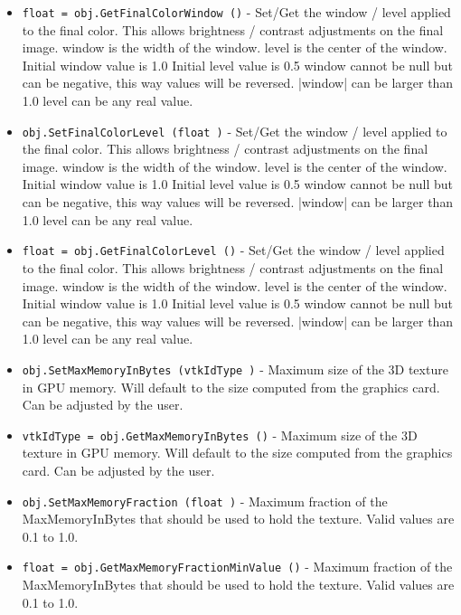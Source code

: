 \begin{itemize}
\item  \verb|float = obj.GetFinalColorWindow ()| -  Set/Get the window / level applied to the final color.
 This allows brightness / contrast adjustments on the
 final image.
 window is the width of the window.
 level is the center of the window.
 Initial window value is 1.0
 Initial level value is 0.5
 window cannot be null but can be negative, this way
 values will be reversed.
 |window| can be larger than 1.0
 level can be any real value.

\item  \verb|obj.SetFinalColorLevel (float )| -  Set/Get the window / level applied to the final color.
 This allows brightness / contrast adjustments on the
 final image.
 window is the width of the window.
 level is the center of the window.
 Initial window value is 1.0
 Initial level value is 0.5
 window cannot be null but can be negative, this way
 values will be reversed.
 |window| can be larger than 1.0
 level can be any real value.

\item  \verb|float = obj.GetFinalColorLevel ()| -  Set/Get the window / level applied to the final color.
 This allows brightness / contrast adjustments on the
 final image.
 window is the width of the window.
 level is the center of the window.
 Initial window value is 1.0
 Initial level value is 0.5
 window cannot be null but can be negative, this way
 values will be reversed.
 |window| can be larger than 1.0
 level can be any real value.

\item  \verb|obj.SetMaxMemoryInBytes (vtkIdType )| -  Maximum size of the 3D texture in GPU memory.
 Will default to the size computed from the graphics
 card. Can be adjusted by the user.

\item  \verb|vtkIdType = obj.GetMaxMemoryInBytes ()| -  Maximum size of the 3D texture in GPU memory.
 Will default to the size computed from the graphics
 card. Can be adjusted by the user.

\item  \verb|obj.SetMaxMemoryFraction (float )| -  Maximum fraction of the MaxMemoryInBytes that should
 be used to hold the texture. Valid values are 0.1 to
 1.0.

\item  \verb|float = obj.GetMaxMemoryFractionMinValue ()| -  Maximum fraction of the MaxMemoryInBytes that should
 be used to hold the texture. Valid values are 0.1 to
 1.0.


\end{itemize}
